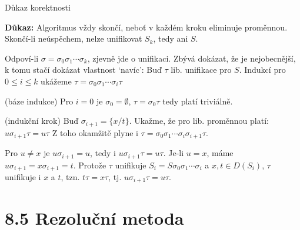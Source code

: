 \documentclass{beamer}
\begin{document}
\begin{frame}{Důkaz korektnosti}
    
    \pause
    
    \pause
    \textbf{Důkaz:} Algoritmus vždy skončí, neboť v každém kroku eliminuje proměnnou. Skončí-li neúspěchem, nelze unifikovat $S_k$, tedy ani $S$.
    
    \pause
    Odpoví-li $\sigma=\sigma_0\sigma_1\cdots\sigma_k$, zjevně jde o unifikaci. Zbývá dokázat, že je nejobecnější, k tomu stačí dokázat vlastnost `navíc': \pause Buď $\tau$ lib. unifikace pro $S$. Indukcí pro $0\leq i\leq k$ ukážeme \alert{$\tau=\sigma_0\sigma_1\cdots\sigma_i\tau$}\pause
    
    \alert{(báze indukce)} Pro $i=0$ je $\sigma_0=\emptyset$, $\tau=\sigma_0\tau$ tedy platí triviálně.\pause

    \alert{(indukční krok)} Buď $\sigma_{i+1}=\{x/t\}$. Ukažme, že pro lib. proměnnou platí: \alert{$u\sigma_{i+1}\tau=u\tau$} \pause Z toho okamžitě plyne i $\tau=\sigma_0\sigma_1\cdots\sigma_i\sigma_{i+1}\tau$.\pause
    
    Pro \alert{$u\neq x$} je $u\sigma_{i+1}=u$, tedy i $u\sigma_{i+1}\tau=u\tau$. Je-li \alert{$u=x$}, máme $u\sigma_{i+1}=x\sigma_{i+1}=t$. Protože $\tau$ unifikuje $S_i=S\sigma_0\sigma_1\cdots\sigma_i$ a $x,t\in D(S_i)$, $\tau$ unifikuje i $x$ a $t$, tzn. $t\tau=x\tau$, tj. $u\sigma_{i+1}\tau=u\tau$.\hfill\qedsymbol

\end{frame}


\section{8.5 Rezoluční metoda}
\end{document}
